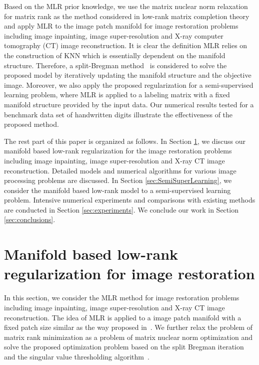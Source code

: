 \documentclass[letterpaper,10pt]{article}
\begin{document}
Based on the MLR prior knowledge, we use the matrix nuclear norm relaxation for matrix rank as the method considered in low-rank matrix completion theory~\cite{CandesRe2008} and apply MLR to the image patch manifold for image restoration problems including image inpainting, image super-resolution and X-ray computer tomography (CT) image reconstruction. It is clear the definition MLR relies on the construction of KNN which is essentially dependent on the manifold structure. Therefore, a split-Bregman method~\cite{goldstein2009split} is considered to solve the proposed model by iteratively updating the manifold structure and the objective image. Moreover, we also apply the proposed regularization for a semi-supervised learning problem, where MLR is applied to a labeling matrix with a fixed manifold structure provided by the input data. Our numerical results tested for a benchmark data set of handwritten digits illustrate the effectiveness of the proposed method.



The rest part of this paper is organized as follows. In Section \ref{sec:MLRimage}, we discuss our manifold based low-rank regularization for the image restoration problems including image inpainting, image super-resolution and X-ray CT image reconstruction. Detailed models and numerical algorithms for various image processing problems are discussed. In Section \ref{sec:SemiSuperLearning}, we consider the manifold based low-rank model to a semi-supervised learning problem. Intensive numerical experiments and comparisons with existing methods are conducted in Section \ref{sec:experiments}. We conclude our work in Section \ref{sec:conclusions}.

\section{Manifold based low-rank regularization for image restoration}
\label{sec:MLRimage}
In this section, we consider the MLR method for image restoration problems including image inpainting, image super-resolution and X-ray CT image reconstruction. The idea of MLR is applied to a image patch manifold with a fixed patch size similar as the way proposed in~\cite{osher2016low}. We further relax the problem of matrix rank minimization as a problem of matrix nuclear norm optimization and solve the proposed optimization problem based on the split Bregman iteration~\cite{goldstein2009split} and the singular value thresholding algorithm~\cite{cai2010singular}.
\end{document}
